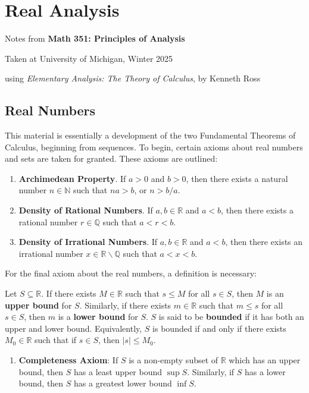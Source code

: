 \section{Real Analysis}

\begin{center}
    Notes from \textbf{Math 351: Principles of Analysis}

    Taken at University of Michigan, Winter 2025

    using \textit{Elementary Analysis: The Theory of Calculus}, by Kenneth Ross
\end{center}

\subsection{Real Numbers}

This material is essentially a development of the two Fundamental Theorems of Calculus, beginning from sequences. To begin, certain axioms about real numbers and sets are taken for granted. These axioms are outlined:

\begin{enumerate}
    \item[] \textbf{Archimedean Property}. If $a>0$ and $b>0$, then there exists a natural number $n\in\mathbb{N}$ such that $na>b$, or $n>b/a$.
    \item[] \textbf{Density of Rational Numbers}. If $a,b\in\mathbb{R}$ and $a<b$, then there exists a rational number $r\in\mathbb{Q}$ such that $a<r<b$.
    \item[] \textbf{Density of Irrational Numbers}. If $a,b\in\mathbb{R}$ and $a<b$, then there exists an irrational number $x\in \mathbb{R}\backslash\mathbb{Q}$ such that $a<x<b$.
\end{enumerate}
    For the final axiom about the real numbers, a definition is necessary:
    \begin{defn}
        Let $S\subseteq\mathbb{R}$. If there exists $M\in\mathbb{R}$ such that $s\leq M$ for all $s\in S$, then $M$ is an \textbf{upper bound} for $S$. Similarly, if there exists $m\in\mathbb{R}$ such that $m\leq s$ for all $s\in S$, then $m$ is a \textbf{lower bound} for $S$. $S$ is said to be \textbf{bounded} if it has both an upper and lower bound. Equivalently, $S$ is bounded if and only if there exists $M_0\in\mathbb{R}$ such that if $s\in S$, then $|s|\leq M_0$.
    \end{defn}
\begin{enumerate}
    \item[] \textbf{Completeness Axiom}: If $S$ is a non-empty subset of $\mathbb{R}$ which has an upper bound, then $S$ has a least upper bound $\sup S$. Similarly, if $S$ has a lower bound, then $S$ has a greatest lower bound $\inf S$.
\end{enumerate}

